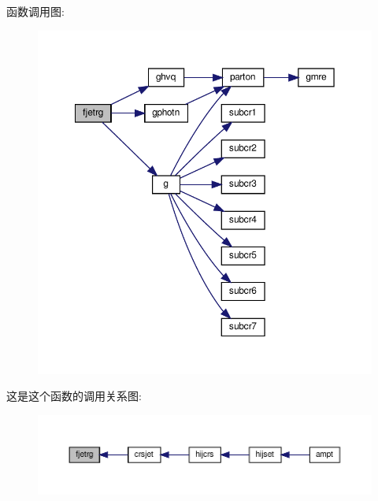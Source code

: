 函数调用图\+:
\nopagebreak
\begin{figure}[H]
\begin{center}
\leavevmode
\includegraphics[width=350pt]{fjetrg_8f90_ad6224d883c74ca125716b789aa980f5f_cgraph}
\end{center}
\end{figure}
这是这个函数的调用关系图\+:
\nopagebreak
\begin{figure}[H]
\begin{center}
\leavevmode
\includegraphics[width=350pt]{fjetrg_8f90_ad6224d883c74ca125716b789aa980f5f_icgraph}
\end{center}
\end{figure}
